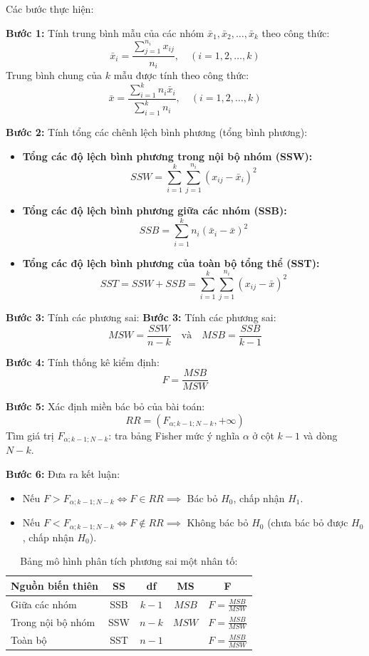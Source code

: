 Các bước thực hiện:

\textbf{Bước 1:} Tính trung bình mẫu của các nhóm $\bar{x}_1, \bar{x}_2, \dots, \bar{x}_k$ theo công thức:
\[
\bar{x}_i = \frac{\sum_{j=1}^{n_i} x_{ij}}{n_i}, \quad (i = 1, 2, \dots, k)
\]
Trung bình chung của $k$ mẫu được tính theo công thức:
\[
\bar{x} = \frac{\sum_{i=1}^k n_i \bar{x}_i}{\sum_{i=1}^k n_i}, \quad (i = 1, 2, \dots, k)
\]

\textbf{Bước 2:} Tính tổng các chênh lệch bình phương (tổng bình phương):

\begin{itemize}
    \item \textbf{Tổng các độ lệch bình phương trong nội bộ nhóm (SSW):}
    \[
    SSW = \sum_{i=1}^k \sum_{j=1}^{n_i} (x_{ij} - \bar{x}_i)^2
    \]

    \item \textbf{Tổng các độ lệch bình phương giữa các nhóm (SSB):}
    \[
    SSB = \sum_{i=1}^k n_i (\bar{x}_i - \bar{x})^2
    \]

    \item \textbf{Tổng các độ lệch bình phương của toàn bộ tổng thể (SST):}
    \[
    SST = SSW + SSB = \sum_{i=1}^k \sum_{j=1}^{n_i} (x_{ij} - \bar{x})^2
    \]
\end{itemize}

\textbf{Bước 3:} Tính các phương sai:
 \textbf{Bước 3:} Tính các phương sai:
\[
MSW = \frac{SSW}{n-k} \quad \text{và} \quad MSB = \frac{SSB}{k-1}
\]

\textbf{Bước 4:} Tính thống kê kiểm định:
\[
F = \frac{MSB}{MSW}
\]

\textbf{Bước 5:} Xác định miền bác bỏ của bài toán:
\[
RR = \left(F_{\alpha; k-1; N-k}, +\infty\right)
\]
Tìm giá trị $F_{\alpha; k-1; N-k}$: tra bảng Fisher mức ý nghĩa $\alpha$ ở cột $k-1$ và dòng $N-k$.

\textbf{Bước 6:} Đưa ra kết luận:
\begin{itemize}
    \item Nếu $F > F_{\alpha; k-1; N-k} \iff F \in RR \implies$ Bác bỏ $H_0$, chấp nhận $H_1$.
    \item Nếu $F < F_{\alpha; k-1; N-k} \iff F \notin RR \implies$ Không bác bỏ $H_0$ (chưa bác bỏ được $H_0$, chấp nhận $H_0$).
\end{itemize}
\begin{table}[h!]
\centering
\caption{Bảng mô hình phân tích phương sai một nhân tố:}
\begin{tabular}{|l|c|c|c|c|}
\hline
\textbf{Nguồn biến thiên} & \textbf{SS}  & \textbf{df}  & \textbf{MS}  & \textbf{F} \\ \hline
Giữa các nhóm             & SSB          & \(k - 1\)    & \(MSB\)      & \(F = \frac{MSB}{MSW}\) \\ \hline
Trong nội bộ nhóm         & SSW          & \(n - k\)    & \(MSW\)      &\(F = \frac{MSB}{MSW}\) \\ \hline
Toàn bộ                  & SST          & \(n - 1\)    &              &\(F = \frac{MSB}{MSW}\) \\ \hline
\end{tabular}
\end{table}